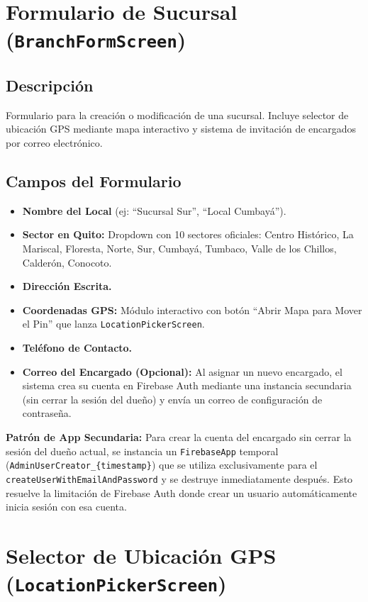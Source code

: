 \documentclass[11pt, a4paper, oneside]{report}
\begin{document}
\section{Formulario de Sucursal (\texttt{BranchFormScreen})}

\subsection{Descripción}
Formulario para la creación o modificación de una sucursal. Incluye selector de ubicación GPS mediante mapa interactivo y sistema de invitación de encargados por correo electrónico.

\subsection{Campos del Formulario}
\begin{itemize}
  \item \textbf{Nombre del Local} (ej: ``Sucursal Sur'', ``Local Cumbayá'').
  \item \textbf{Sector en Quito:} Dropdown con 10 sectores oficiales: Centro Histórico, La Mariscal, Floresta, Norte, Sur, Cumbayá, Tumbaco, Valle de los Chillos, Calderón, Conocoto.
  \item \textbf{Dirección Escrita.}
  \item \textbf{Coordenadas GPS:} Módulo interactivo con botón ``Abrir Mapa para Mover el Pin'' que lanza \texttt{LocationPickerScreen}.
  \item \textbf{Teléfono de Contacto.}
  \item \textbf{Correo del Encargado (Opcional):} Al asignar un nuevo encargado, el sistema crea su cuenta en Firebase Auth mediante una instancia secundaria (sin cerrar la sesión del dueño) y envía un correo de configuración de contraseña.
\end{itemize}

\begin{techbox}
\textbf{Patrón de App Secundaria:} Para crear la cuenta del encargado sin cerrar la sesión del dueño actual, se instancia un \texttt{FirebaseApp} temporal (\texttt{AdminUserCreator\_\{timestamp\}}) que se utiliza exclusivamente para el \texttt{createUserWithEmailAndPassword} y se destruye inmediatamente después. Esto resuelve la limitación de Firebase Auth donde crear un usuario automáticamente inicia sesión con esa cuenta.
\end{techbox}

\section{Selector de Ubicación GPS (\texttt{LocationPickerScreen})}
\end{document}
